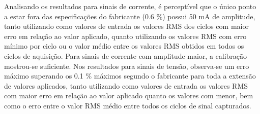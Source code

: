 \begin{table}[H]
\end{table}

Analisando os resultados para sinais de corrente, é perceptível que o único ponto a estar fora das especificações do fabricante (0.6 $\%$) possui 50 mA de amplitude, tanto utilizando como valores de entrada os valores RMS dos ciclos com maior erro em relação ao valor aplicado, quanto utilizando os valores RMS com erro mínimo por ciclo ou o valor médio entre os valores RMS obtidos em todos os ciclos de aquisição.  Para sinais de corrente com amplitude maior, a calibração mostrou-se suficiente. Nos resultados para sinais de tensão, observa-se um erro máximo superando os 0.1 $\%$ máximos segundo o fabricante para toda a extensão de valores aplicados, tanto utilizando como valores de entrada os valores RMS com maior erro em relação ao valor aplicado quanto os valores com menor, bem como o erro entre o valor RMS médio entre todos os ciclos de sinal capturados. 

